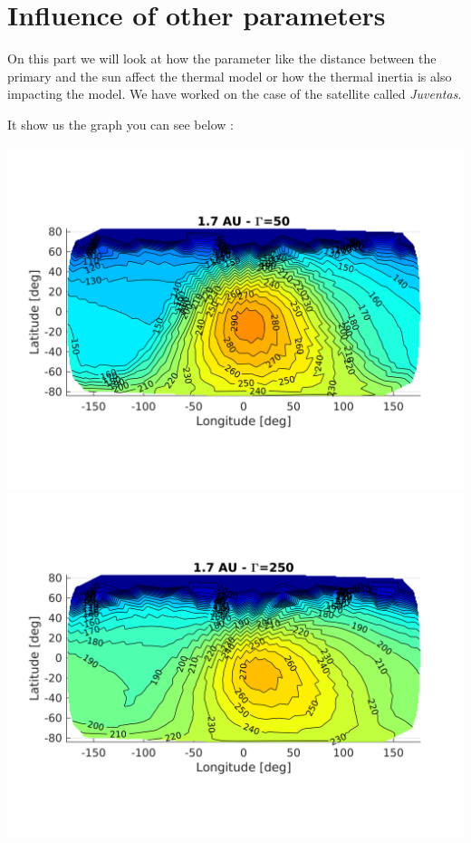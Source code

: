 \section{Influence of other parameters}
\label{influence}

On this part we will look at how the parameter like the distance between the primary and the sun affect the thermal model or how the thermal inertia is also impacting the model.
We have worked on the case of the satellite called \textit{Juventas}.

It show us the graph you can see below : 

\begin{center}
	\includegraphics[scale=1]{rsc/juventas_d1.7_g50.png}
	\includegraphics[scale=1]{rsc/juventas_d1.7_g250.png}

\end{center}

